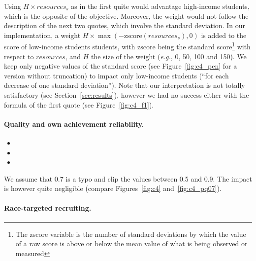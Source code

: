 Using $H \times resources_s$ as in the first quite would advantage high-income students, which is the opposite of the objective. Moreover, the weight would not follow the description of the next two quotes, which involve the standard deviation. In our implementation, a weight $H \times \max(-\mathrm{zscore}({resources}_s), 0)$ is added to the score of low-income students students, with $\mathrm{zscore}$ being the standard score\footnote{The zscore variable is the number of standard deviations by which the value of a raw score is above or below the mean value of what is being observed or measured} with respect to $resources$, and $H$ the size of the weight (\emph{e.g.}, 0, 50, 100 and 150).
We keep only negative values of the standard score (see Figure~\ref{fig:c4_pen} for a version without truncation) to impact only low-income students (``for each decrease of one standard
deviation'').
Note that our interpretation is not totally satisfactory (see Section~\ref{sec:results}), however we had no success either with the formula of the first quote (see Figure~\ref{fig:c4_f1}).

\paragraph{Quality and own achievement reliability.}

\begin{itemize}

\item{}

\item{}

\item{}

\end{itemize}

We assume that 0.7 is a typo and clip the values between 0.5 and 0.9. The impact is however quite negligible (compare  Figures~\ref{fig:c4} and~\ref{fig:c4_pq07}).

\paragraph{Race-targeted recruiting.}

